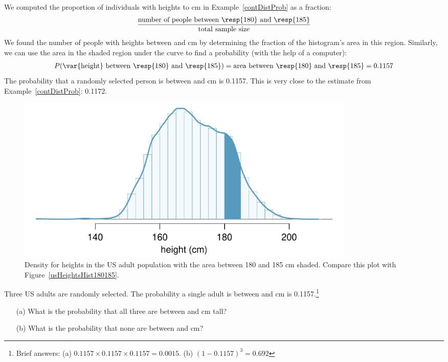 We computed the proportion of individuals with heights  to  cm in Example~\ref{contDistProb} as a fraction:
\begin{eqnarray*}
\frac{\text{number of people between \resp{180} and \resp{185}}}{\text{total sample size}}
\end{eqnarray*}
We found the number of people with heights between  and  cm by determining the fraction of the histogram's area in this region. Similarly, we can use the area in the shaded region under the curve to find a probability (with the help of a computer):
\begin{eqnarray*}
P(\text{\var{height} between \resp{180} and \resp{185}})
	= \text{area between \resp{180} and \resp{185}}
	= 0.1157
\end{eqnarray*}
The probability that a randomly selected person is between  and  cm is 0.1157. This is very close to the estimate from Example~\ref{contDistProb}: 0.1172.

\begin{figure}
\centering
\includegraphics[width=0.8\textwidth]{ch_probability/figures/fdicHeightContDistFilled/fdicHeightContDistFilled}
\caption{Density for heights in the US adult population with the area between 180 and 185 cm shaded. Compare this plot with Figure~\ref{usHeightsHist180185}.}
\label{fdicHeightContDistFilled}
\end{figure}

\textPE{\pagebreak}

\begin{exercise}
Three US adults are randomly selected. The probability a single adult is between  and  cm is 0.1157.\footnote{Brief answers: (a) $0.1157 \times 0.1157 \times 0.1157 = 0.0015$. (b) $(1-0.1157)^3 = 0.692$} \vspace{-1.5mm}
\begin{enumerate}
\setlength{\itemsep}{0mm}
\item[(a)] What is the probability that all three are between  and  cm tall?
\item[(b)] What is the probability that none are between  and  cm?
\end{enumerate}
\end{exercise}

